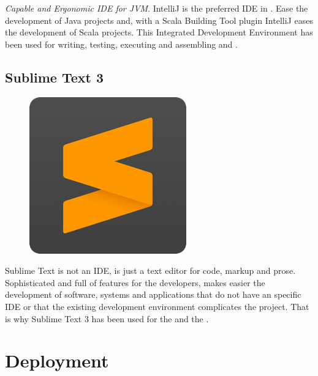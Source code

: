 \textit{Capable and Ergonomic IDE for JVM}. IntelliJ is the preferred IDE\cite{ide} in \company. Ease the development of Java projects and, with a Scala Building Tool plugin IntelliJ eases the development of Scala projects. This Integrated Development Environment has been used for writing, testing, executing and assembling  and .

\subsection*{Sublime Text 3\cite{sublimetext}}

\begin{figure}[H]
\includegraphics[scale=0.1]{resources/sublime-logo.png}
\end{figure}

Sublime Text is not an IDE, is just a text editor for code, markup and prose. Sophisticated and full of features for the developers, makes easier the development of software, systems and applications that do not have an specific IDE or that the existing development environment complicates the project. That is why Sublime Text 3 has been used for the  and the .

\section{Deployment}



